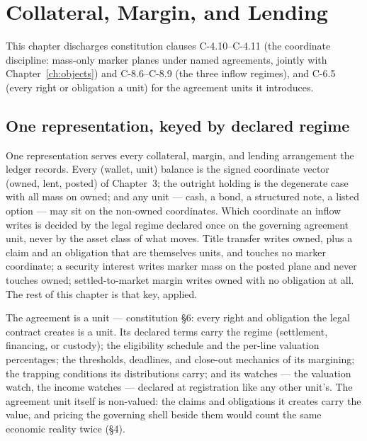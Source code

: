 
\section{Collateral, Margin, and Lending}\label{ch:collateral}

This chapter discharges constitution clauses C-4.10--C-4.11 (the coordinate discipline: mass-only marker planes under named agreements, jointly with Chapter~\ref{ch:objects}) and C-8.6--C-8.9 (the three inflow regimes), and C-6.5 (every right or obligation a unit) for the agreement units it introduces.

\subsection{One representation, keyed by declared regime}

One representation serves every collateral, margin, and lending arrangement the
ledger records. Every (wallet, unit) balance is the signed coordinate vector
(owned, lent, posted) of Chapter~3; the outright holding is the degenerate case
with all mass on owned; and any unit --- cash, a bond, a structured note, a
listed option --- may sit on the non-owned coordinates. Which coordinate an
inflow writes is decided by the legal regime declared once on the governing
agreement unit, never by the asset class of what moves. Title transfer writes
owned, plus a claim and an obligation that are themselves units, and touches no
marker coordinate; a security interest writes marker mass on the posted plane
and never touches owned; settled-to-market margin writes owned with no
obligation at all. The rest of this chapter is that key, applied.

The agreement is a unit --- constitution \S6: every right and obligation the
legal contract creates is a unit. Its declared terms carry the regime
(settlement, financing, or custody); the eligibility schedule and the per-line
valuation percentages; the thresholds, deadlines, and close-out mechanics of
its margining; the trapping conditions its distributions carry; and its
watches --- the valuation watch, the income watches --- declared at
registration like any other unit's. The agreement unit itself is non-valued:
the claims and obligations it creates carry the value, and pricing the
governing shell beside them would count the same economic reality twice
(\S4).

